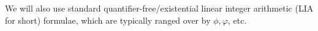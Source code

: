 



We will also use standard  quantifier-free/existential linear integer arithmetic (LIA for short) formulae, which are typically ranged over by $\phi, \varphi$, etc. %

%

